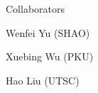 
\prefix{}
\begin{rubric}{Collaborators}


	{\large Wenfei Yu (SHAO) \par}
	{\large Xuebing Wu (PKU) \par}
	
	
	{\large Hao Liu (UTSC) \par}



\end{rubric}
	






